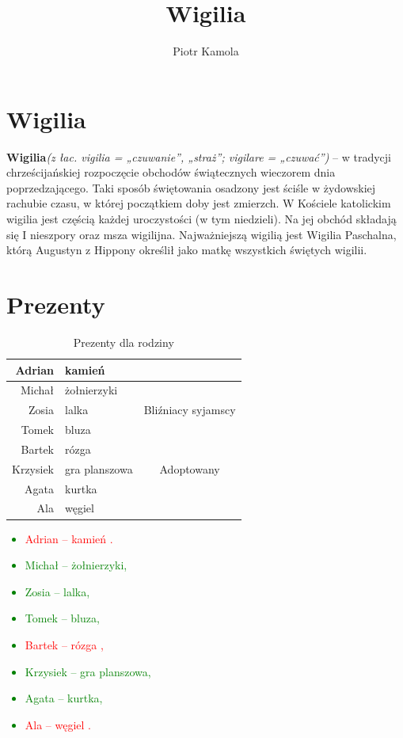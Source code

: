 \documentclass[11pt]{book}
\title{Wigilia}
\author{Piotr Kamola}
\begin{document}

\maketitle
\noindent
\tableofcontents
\listoftables
\listoffigures

\chapter{Wigilia}
{\Large
\textbf{Wigilia}\textit{(z łac. vigilia = „czuwanie”, „straż”; vigilare = „czuwać”)} – w tradycji chrześcijańskiej rozpoczęcie obchodów świątecznych wieczorem dnia poprzedzającego. Taki sposób świętowania osadzony jest ściśle w żydowskiej rachubie czasu, w której początkiem doby jest zmierzch.
W Kościele katolickim wigilia jest częścią każdej uroczystości (w tym niedzieli). Na jej obchód składają się I nieszpory oraz msza wigilijna. Najważniejszą wigilią jest Wigilia Paschalna, którą Augustyn z Hippony określił jako matkę wszystkich świętych wigilii. 
}

\chapter{Prezenty}
\begin{table}[h]
\caption{Prezenty dla rodziny}
\label{Prezenty}
\begin{center}
\begin{tabular}{|r|l|c|}
  \hline
  Adrian & kamień & \\
  \hline
  Michał & żołnierzyki & \\
  \hline
  Zosia & lalka & Bliźniacy syjamscy\\
  Tomek & bluza & \\
  \hline
  Bartek & rózga & \\
  \hline
  \hline
  Krzysiek & gra planszowa & Adoptowany \\
  \hline
  \hline
  Agata & kurtka & \\
  \hline 
  Ala & węgiel & \\
  \hline
\end{tabular} 
\end{center}
\end{table}

\textcolor{green}{
\begin{itemize}
	\item \textcolor{red}{Adrian – kamień \cite{bbb}.}
	\item Michał -- żołnierzyki,
	\item Zosia -- lalka,
	\item Tomek -- bluza,
	\item \textcolor{red}{Bartek -- rózga \cite{aaa} ,}
	\item Krzysiek -- gra planszowa,
	\item Agata -- kurtka,
	\item \textcolor{red}{Ala – węgiel \cite{ccc}.}
\end{itemize}
}
\end{document}
